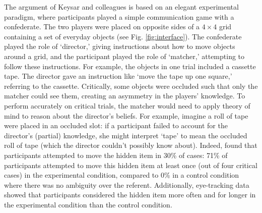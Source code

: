\documentclass[10pt,letterpaper]{article}
\begin{document}
The argument of Keysar and colleagues is based on an elegant experimental paradigm, where participants played a simple communication game with a confederate. The two players were placed on opposite sides of a $4 \times 4$ grid containing a set of everyday objects (see Fig. \ref{fig:interface}). The confederate played the role of `director,' giving instructions about how to move objects around a grid, and the participant played the role of `matcher,' attempting to follow these instructions. For example, the objects in one trial included a cassette tape. The director gave an instruction like `move the tape up one square,' referring to the cassette.
Critically, some objects were occluded such that only the matcher could see them, creating an asymmetry in the players' knowledge. To perform accurately on critical trials, the matcher would need to apply theory of mind to reason about the director's beliefs. For example, imagine a roll of tape were placed in an occluded slot: if a participant failed to account for the director's (partial) knowledge, she might interpret `tape' to mean the occluded roll of tape (which the director couldn't possibly know about). 
Indeed,  found that participants attempted to move the hidden item in 30\% of cases: 71\% of participants attempted to move this hidden item at least once (out of four critical cases) in the experimental condition, compared to 0\% in a control condition where there was no ambiguity over the referent. 
Additionally, eye-tracking data showed that participants considered the hidden item more often and for longer in the experimental condition than the control condition. 
\end{document}
